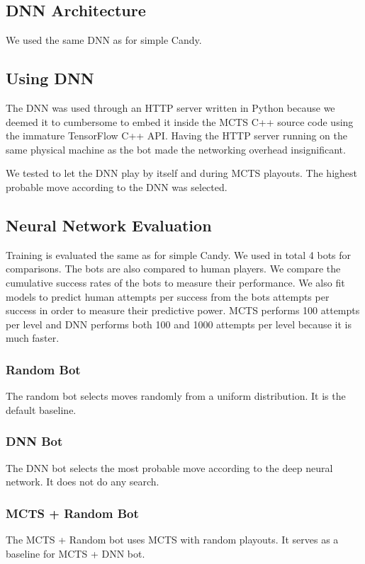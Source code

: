 \documentclass{kththesis}
\begin{document}
\subsection{DNN Architecture}
We used the same DNN as for simple Candy.

\subsection{Using DNN}
The DNN was used through an HTTP server written in Python because we deemed it to cumbersome to embed it inside the MCTS C++ source code using the immature TensorFlow C++ API. Having the HTTP server running on the same physical machine as the bot made the networking overhead  insignificant.

We tested  to let the DNN play by itself and during MCTS playouts. The highest probable move according to the DNN was selected.

\subsection{Neural Network Evaluation}
Training is evaluated the same as for simple Candy. We used in total 4 bots for comparisons. The bots are also compared to human players. We compare the cumulative success rates of the bots to measure their performance. We also fit models to predict human attempts per success from the bots attempts per success in order to measure their predictive power. MCTS performs 100 attempts per level and DNN performs both 100 and 1000 attempts per level because it is much faster. 

\subsubsection{Random Bot}
The random bot selects moves randomly from a uniform distribution. It is the default baseline. 

\subsubsection{DNN Bot}
The DNN bot selects the most probable move according to the deep neural network. It does not do any search. 

\subsubsection{MCTS + Random Bot}
The MCTS + Random  bot uses MCTS with random playouts. It serves as a baseline for MCTS + DNN bot.
\end{document}
